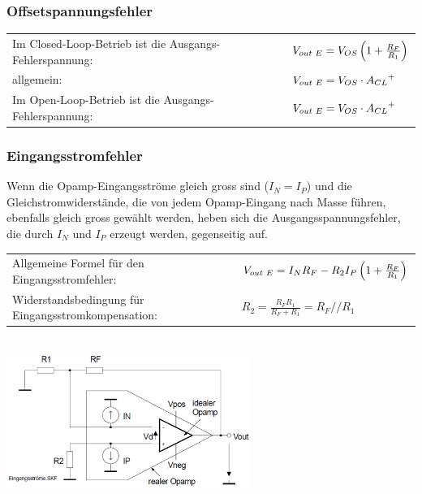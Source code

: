 		\subsubsection{Offsetspannungsfehler}
				\begin{tabular}{ll}
					Im Closed-Loop-Betrieb ist die Ausgangs-Fehlerspannung: &
					$V_{out \hspace{1mm}E}=V_{OS}\left( 1+\frac{R_F}{R_1}\right)$\\
          allgemein: &
          $V_{out \hspace{1mm}E}=V_{OS} \cdot {A_{CL}}^{+}$\\
          Im Open-Loop-Betrieb ist die Ausgangs-Fehlerspannung: &
          $V_{out \hspace{1mm}E}=V_{OS}\cdot {A_{CL}}^{+}$\\
         \end{tabular}
		
		\subsubsection{Eingangsstromfehler}
			\begin{minipage}{18cm}
              Wenn die Opamp-Eingangsströme gleich gross sind
              ($I_{N}=I_{P}$) und die Gleichstromwiderstände,
              die von jedem Opamp-Eingang nach Masse führen, 
              ebenfalls gleich gross gewählt werden, heben sich die
              Ausgangsspannungsfehler, die durch $I_{N}$ und $I_{P}$
              erzeugt werden, gegenseitig auf. \\
              \begin{tabular}{ll}
              Allgemeine Formel für den
              Eingangsstromfehler: &
              $V_{out \hspace{1mm}E}=I_N R_F-R_2 I_P\left( 1+\frac{R_F}{R_1} \right)$\\
              Widerstandsbedingung für Eingangsstromkompensation:&
              $R_2=\frac{R_F R_1}{R_F+R_1}=R_F // R_1$\\
            	\end{tabular}
            \end{minipage}\\
			\includegraphics[width=8cm]{./images/eingangsstromfehler.png}

